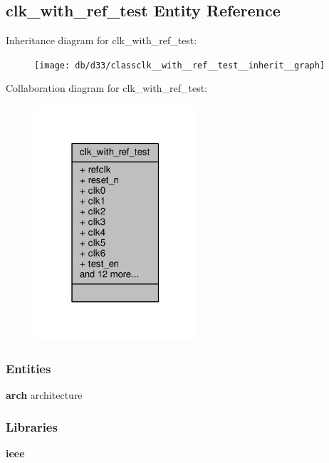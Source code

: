 \subsection{clk\+\_\+with\+\_\+ref\+\_\+test Entity Reference}
\label{classclk__with__ref__test}


Inheritance diagram for clk\+\_\+with\+\_\+ref\+\_\+test\+:\nopagebreak
\begin{figure}[H]
\begin{center}
\leavevmode
\texttt{[image: db/d33/classclk\_\_with\_\_ref\_\_test\_\_inherit\_\_graph]}
\end{center}
\end{figure}


Collaboration diagram for clk\+\_\+with\+\_\+ref\+\_\+test\+:\nopagebreak
\begin{figure}[H]
\begin{center}
\leavevmode
\includegraphics[width=171pt]{d6/db1/classclk__with__ref__test__coll__graph}
\end{center}
\end{figure}
\subsubsection*{Entities}
\begin{DoxyCompactItemize}
\item 
{\bf arch} architecture
\end{DoxyCompactItemize}
\subsubsection*{Libraries}
 \begin{DoxyCompactItemize}
\item 
{\bf ieee} 
\end{DoxyCompactItemize}
